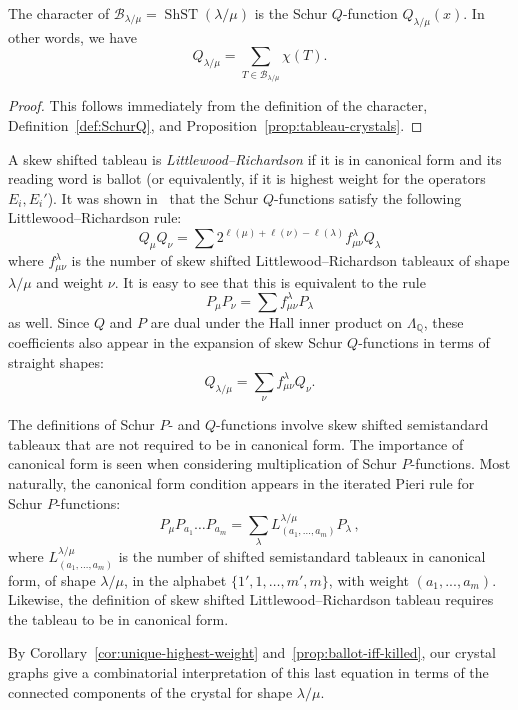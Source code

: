 \documentclass[ALCO,ThmDefs,Unicode,epreuves]{cedram}
\DeclareMathOperator{\ShST}{ShST}
\newcommand{\B}{\mathcal{B}}
\newcommand{\defn}[1]{\emph{#1}}
\begin{document}
\begin{prop}
The character of $\B_{\lambda/\mu} = \ShST(\lambda/\mu)$ is the Schur $Q$-function $Q_{\lambda/\mu}(x)$. In other words, we have
\[
Q_{\lambda/\mu}=\sum_{T\in \B_{\lambda/\mu}} \chi(T).
\]
\end{prop}

\begin{proof}
This follows immediately from the definition of the character, Definition~\ref{def:SchurQ}, and Proposition~\ref{prop:tableau-crystals}.
\end{proof}

A skew shifted tableau is \defn{Littlewood--Richardson} if it is in canonical form and its reading word is ballot (or equivalently, if it is highest weight for the operators $E_i,E_i'$). It was shown in~\cite{Stembridge} that the Schur $Q$-functions satisfy the following Littlewood--Richardson rule:
\[
Q_\mu Q_\nu=\sum 2^{\ell(\mu)+\ell(\nu)-\ell(\lambda)}f^{\lambda}_{\mu\nu}Q_\lambda
\]
where $f^{\lambda}_{\mu\nu}$ is the number of skew shifted Littlewood--Richardson tableaux of shape $\lambda/\mu$ and weight $\nu$. It is easy to see that this is equivalent to the rule 
\[
P_\mu P_\nu=\sum f^{\lambda}_{\mu\nu}P_\lambda
\]
 as well. Since $Q$ and $P$ are dual under the Hall inner product on $\Lambda_\mathbb{Q}$, these coefficients also appear in the expansion of skew Schur $Q$-functions in terms of straight shapes: 
\begin{equation} \label{eqn:skew-LR-schurQ}
Q_{\lambda/\mu} = \sum_\nu f_{\mu\nu}^\lambda Q_\nu.
\end{equation}

\begin{rema}
The definitions of Schur $P$- and $Q$-functions involve skew shifted semistandard tableaux that are not required to be in canonical form. The importance of canonical form is seen when considering multiplication of Schur $P$-functions. Most naturally, the canonical form condition appears in the iterated Pieri rule for Schur $P$-functions:
\[
P_\mu P_{a_1} \dots P_{a_m} = \sum_\lambda L^{\lambda/\mu}_{(a_1,\dots,a_m)} P_\lambda
\,,
\]
where $L^{\lambda/\mu}_{(a_1,\dots,a_m)}$ is the number of shifted semistandard tableaux in canonical form, of shape $\lambda/\mu$, in the alphabet $\{1',1,\ldots,m',m\}$, with weight $(a_1,...,a_m)$. Likewise, the definition of skew shifted Littlewood--Richardson tableau requires the tableau to be in canonical form.
\end{rema}

By Corollary~\ref{cor:unique-highest-weight} and~\ref{prop:ballot-iff-killed}, our crystal graphs give a combinatorial interpretation of this last equation in terms of the connected components of the crystal for shape $\lambda/\mu$.
\end{document}
